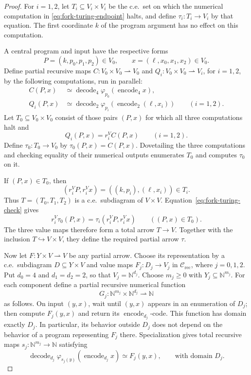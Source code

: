 \documentclass[11pt]{article}
\newcommand{\N}{\mathbb N}
\begin{document}
\begin{proof}
For $i=1,2$, let $T_i\subseteq V_i\times V_i$ be the c.e.\ set
on which the numerical computation in
\eqref{eq:fork-turing-endpoint} halts, and define
$\tau_i:T_i\to V_i$ by that equation. The first coordinate $k$
of the program argument has no effect on this computation.

A central program and input have the respective forms
\[
 P=(k,p_0,p_1,p_2)\in V_0,
 \qquad x=(\ell,x_0,x_1,x_2)\in V_0.
\]
Define partial recursive maps
$C:V_0\times V_0\rightharpoonup V_0$ and
$Q_i:V_0\times V_0\rightharpoonup V_i$, for $i=1,2$,
by the following computations, run in parallel:
\begin{align*}
 C(P,x)&\simeq
   \operatorname{decode}_4
      \varphi_{p_0}(\operatorname{encode}_4 x),\\
 Q_i(P,x)&\simeq
   \operatorname{decode}_2
      \varphi_{p_i}(\operatorname{encode}_2(\ell,x_i))
      \qquad(i=1,2).
\end{align*}
Let $T_0\subseteq V_0\times V_0$ consist of those pairs $(P,x)$
for which all three computations halt and
\begin{equation}\label{eq:fork-turing-check}
 Q_i(P,x)=r_i^V C(P,x)\qquad(i=1,2).
\end{equation}
Define $\tau_0:T_0\to V_0$ by $\tau_0(P,x)=C(P,x)$.
Dovetailing the three computations and checking equality of their
numerical outputs enumerates $T_0$ and computes $\tau_0$ on it.

If $(P,x)\in T_0$, then
\[
 (r_i^V P,r_i^V x)=((k,p_i),(\ell,x_i))\in T_i.
\]
Thus $T=(T_0,T_1,T_2)$ is a c.e.\ subdiagram of $V\times V$.
Equation~\eqref{eq:fork-turing-check} gives
\[
 r_i^V\tau_0(P,x)
   =\tau_i(r_i^V P,r_i^V x)
 \qquad((P,x)\in T_0).
\]
The three value maps therefore form a total arrow $T\to V$.
Together with the inclusion $T\hookrightarrow V\times V$,
they define the required partial arrow $\tau$.

Now let $F:Y\times V\rightharpoonup V$ be any partial arrow.
Choose its representation by a c.e.\ subdiagram
$D\subseteq Y\times V$ and value maps
$F_j:D_j\to V_j$ in $\mathcal C_{\mathrm{rec}}$, where $j=0,1,2$.
Put $d_0=4$ and $d_1=d_2=2$, so that $V_j=\N^{d_j}$.
Choose $m_j\geq0$ with $Y_j\subseteq\N^{m_j}$.
For each component define a partial recursive numerical function
\[
 G_j:\N^{m_j}\times\N^{d_j}\rightharpoonup\N
\]
as follows. On input $(y,x)$, wait until $(y,x)$ appears in an
enumeration of $D_j$; then compute $F_j(y,x)$ and return its
$\operatorname{encode}_{d_j}$-code. This function has domain
exactly $D_j$. In particular, its behavior outside $D_j$ does
not depend on the behavior of a program representing $F_j$ there.
Specialization gives total recursive maps
$s_j:\N^{m_j}\to\N$ satisfying
\begin{equation}\label{eq:fork-specialization}
 \operatorname{decode}_{d_j}
   \varphi_{s_j(y)}(\operatorname{encode}_{d_j}x)
 \simeq F_j(y,x),
 \qquad\text{with domain }D_j.
\end{equation}


\end{proof}
\end{document}
